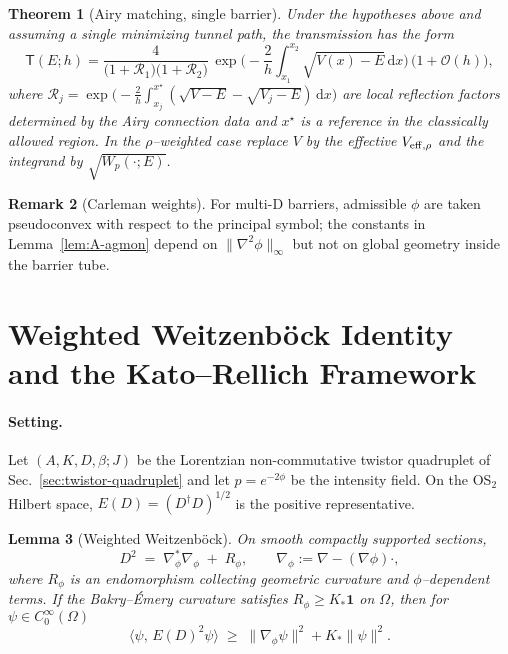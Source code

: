 \documentclass[11pt]{article}
\newtheorem{theorem}{Theorem}[section]
\newtheorem{lemma}[theorem]{Lemma}
\theoremstyle{definition}
\newtheorem{remark}[theorem]{Remark}
\begin{document}
    \begin{theorem}[Airy matching, single barrier]\label{thm:A-airy}
    	Under the hypotheses above and assuming a single minimizing tunnel path, the transmission has the form
    	\[
    	\mathsf{T}(E;h)=\frac{4}{\big(1+\mathcal{R}_1\big)\big(1+\mathcal{R}_2\big)}\,
    	\exp\!\Big(-\frac{2}{h}\!\int_{x_1}^{x_2}\!\sqrt{V(x)-E}\,\mathrm{d}x\Big)\,\big(1+\mathcal{O}(h)\big),
    	\]
    	where $\mathcal{R}_j = \exp\!\big(-\tfrac{2}{h}\!\int_{x_j}^{x^\star}\!(\sqrt{V-E}-\sqrt{V_j-E})\,\mathrm{d}x\big)$ are local reflection factors determined by the Airy connection data and $x^\star$ is a reference in the classically allowed region.
    	In the $\rho$–weighted case replace $V$ by the effective $V_{\rm eff,\rho}$ and the integrand by $\sqrt{W_p(\cdot;E)}$.
    \end{theorem}
    
    \begin{remark}[Carleman weights]
    	For multi-D barriers, admissible $\phi$ are taken pseudoconvex with respect to the principal symbol; the constants in Lemma~\ref{lem:A-agmon} depend on $\|\nabla^2\phi\|_\infty$ but not on global geometry inside the barrier tube.
    \end{remark}
    
    \section{Weighted Weitzenböck Identity and the Kato--Rellich Framework}
    \label{app:weitzenbock-kato}
    
    \paragraph{Setting.}
    Let $(A,K,D,\beta;J)$ be the Lorentzian non-commutative twistor quadruplet of Sec.~\ref{sec:twistor-quadruplet} and let $p = e^{-2\phi}$ be the intensity field.
    On the OS$_2$ Hilbert space, $E(D)=(D^\dagger D)^{1/2}$ is the positive representative.
    
    \begin{lemma}[Weighted Weitzenböck]\label{lem:B-weitzenbock}
    	On smooth compactly supported sections,
    	\[
    	D^2 \;=\; \nabla_\phi^\ast\nabla_\phi \;+\; R_\phi, 
    	\qquad
    	\nabla_\phi := \nabla - (\nabla\phi)\cdot,
    	\]
    	where $R_\phi$ is an endomorphism collecting geometric curvature and $\phi$–dependent terms. 
    	If the Bakry--Émery curvature satisfies $R_\phi\ge K_\ast \mathbf{1}$ on $\Omega$, then for $\psi\in C_0^\infty(\Omega)$
    	\[
    	\langle \psi,\,E(D)^2\psi\rangle \;\ge\; \|\nabla_\phi \psi\|^2 + K_\ast\|\psi\|^2.
    	\]
    \end{lemma}
    
\end{document}
